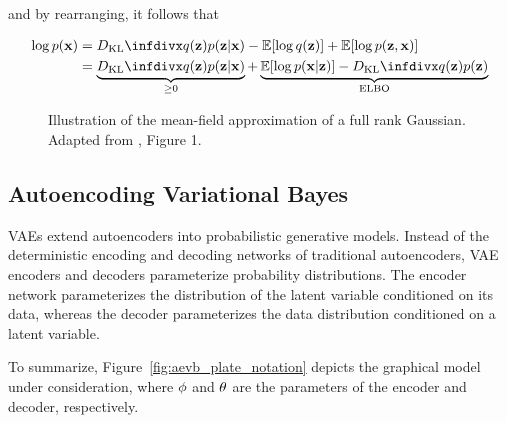 and by rearranging, it follows that

\begin{equation}
\begin{aligned}
\log p(\mathbf{x}) &= \dkl{q(\mathbf{z})}{p(\mathbf{z} \vert \mathbf{x})} - \mathbb{E}[\log q(\mathbf{z})] + \mathbb{E}[\log p(\mathbf{z}, \mathbf{x})] \\
                   &= \underbrace{\dkl{q(\mathbf{z})}{p(\mathbf{z} \vert \mathbf{x})}}_{\geq 0} + \underbrace{\mathbb{E}[\log p(\mathbf{x} \vert \mathbf{z})] - \dkl{q(\mathbf{z})}{p(\mathbf{z})}}_{\text{ELBO}}
\end{aligned}
\end{equation}


\begin{figure}[!htb]
  \centering
  \resizebox{0.5\textwidth}{!}{\unskip}
  \caption{Illustration of the mean-field approximation of a full rank Gaussian. Adapted from \cite{variational_inference_review}, Figure 1.}
  \label{fig:mean_field_approximation}
\end{figure}

\subsection{Autoencoding Variational Bayes}

VAEs extend autoencoders into probabilistic generative models. Instead of the deterministic encoding and decoding networks of traditional autoencoders, VAE encoders and decoders parameterize probability distributions. The encoder network parameterizes the distribution of the latent variable conditioned on its data, whereas the decoder parameterizes the data distribution conditioned on a latent variable.


To summarize, Figure~\ref{fig:aevb_plate_notation} depicts the graphical model under consideration, where $\mathbf{\phi}$ and $\mathbf{\theta}$ are the parameters of the encoder and decoder, respectively.


